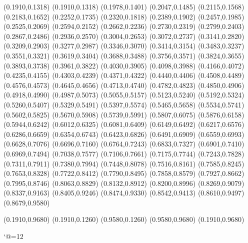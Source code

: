 \PST@Dotted(0.1910,0.1318)
(0.1910,0.1318)
(0.1978,0.1401)
(0.2047,0.1485)
(0.2115,0.1568)
(0.2183,0.1652)
(0.2252,0.1735)
(0.2320,0.1818)
(0.2389,0.1902)
(0.2457,0.1985)
(0.2525,0.2069)
(0.2594,0.2152)
(0.2662,0.2236)
(0.2730,0.2319)
(0.2799,0.2403)
(0.2867,0.2486)
(0.2936,0.2570)
(0.3004,0.2653)
(0.3072,0.2737)
(0.3141,0.2820)
(0.3209,0.2903)
(0.3277,0.2987)
(0.3346,0.3070)
(0.3414,0.3154)
(0.3483,0.3237)
(0.3551,0.3321)
(0.3619,0.3404)
(0.3688,0.3488)
(0.3756,0.3571)
(0.3824,0.3655)
(0.3893,0.3738)
(0.3961,0.3822)
(0.4030,0.3905)
(0.4098,0.3988)
(0.4166,0.4072)
(0.4235,0.4155)
(0.4303,0.4239)
(0.4371,0.4322)
(0.4440,0.4406)
(0.4508,0.4489)
(0.4576,0.4573)
(0.4645,0.4656)
(0.4713,0.4740)
(0.4782,0.4823)
(0.4850,0.4906)
(0.4918,0.4990)
(0.4987,0.5073)
(0.5055,0.5157)
(0.5123,0.5240)
(0.5192,0.5324)
(0.5260,0.5407)
(0.5329,0.5491)
(0.5397,0.5574)
(0.5465,0.5658)
(0.5534,0.5741)
(0.5602,0.5825)
(0.5670,0.5908)
(0.5739,0.5991)
(0.5807,0.6075)
(0.5876,0.6158)
(0.5944,0.6242)
(0.6012,0.6325)
(0.6081,0.6409)
(0.6149,0.6492)
(0.6217,0.6576)
(0.6286,0.6659)
(0.6354,0.6743)
(0.6423,0.6826)
(0.6491,0.6909)
(0.6559,0.6993)
(0.6628,0.7076)
(0.6696,0.7160)
(0.6764,0.7243)
(0.6833,0.7327)
(0.6901,0.7410)
(0.6969,0.7494)
(0.7038,0.7577)
(0.7106,0.7661)
(0.7175,0.7744)
(0.7243,0.7828)
(0.7311,0.7911)
(0.7380,0.7994)
(0.7448,0.8078)
(0.7516,0.8161)
(0.7585,0.8245)
(0.7653,0.8328)
(0.7722,0.8412)
(0.7790,0.8495)
(0.7858,0.8579)
(0.7927,0.8662)
(0.7995,0.8746)
(0.8063,0.8829)
(0.8132,0.8912)
(0.8200,0.8996)
(0.8269,0.9079)
(0.8337,0.9163)
(0.8405,0.9246)
(0.8474,0.9330)
(0.8542,0.9413)
(0.8610,0.9497)
(0.8679,0.9580)

\PST@Border(0.1910,0.9680)
(0.1910,0.1260)
(0.9580,0.1260)
(0.9580,0.9680)
(0.1910,0.9680)

\catcode`@=12
\fi
\endpspicture
